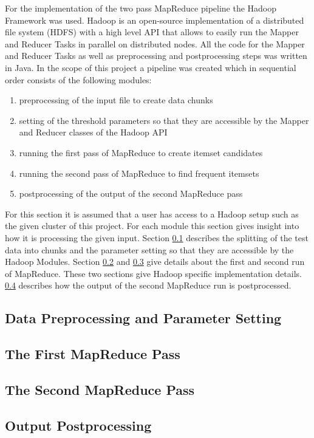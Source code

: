 For the implementation of the two pass MapReduce pipeline the Hadoop Framework was used. Hadoop is an open-source implementation of a distributed file system (HDFS) with a high level API that allows to easily run the Mapper and Reducer Tasks in parallel on distributed nodes. All the code for the Mapper and Reducer Tasks as well as preprocessing and postprocessing steps was written in Java. In the scope of this project a pipeline was created which in sequential order consists of the following modules:
\begin{enumerate}
\item preprocessing of the input file to create data chunks 
\item setting of the threshold parameters so that they are accessible by the Mapper and Reducer classes of the Hadoop API
\item running the first pass of MapReduce to create itemset candidates
\item running the second pass of MapReduce to find frequent itemsets
\item postprocessing of the output of the second MapReduce pass
\end{enumerate}
For this section it is assumed that a user has access to a Hadoop setup such as the given cluster of this project. For each module this section gives insight into how it is processing the given input. Section \ref{preprocessing} describes the splitting of the test data into chunks and the parameter setting so that they are accessible by the Hadoop Modules. Section \ref{first pass details} and \ref{second pass details} give details about the first and second run of MapReduce. These two sections give Hadoop specific implementation details. \ref{postprocessing} describes how the output of the second MapReduce run is postprocessed.
\subsection{Data Preprocessing and Parameter Setting}\label{preprocessing}
\subsection{The First MapReduce Pass}\label{first pass details}
\subsection{The Second MapReduce Pass}\label{second pass details}
\subsection{Output Postprocessing}\label{postprocessing}